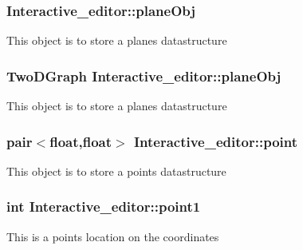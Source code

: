 \subsubsection[{\texorpdfstring{plane\+Obj}{planeObj}}]{ Interactive\+\_\+editor\+::plane\+Obj}\hypertarget{classInteractive__editor_ace6d6a503a0b62b7a8b6f87177dca677}{}\label{classInteractive__editor_ace6d6a503a0b62b7a8b6f87177dca677}
This object is to store a plane\textquotesingle{}s datastructure 
\subsubsection[{\texorpdfstring{plane\+Obj}{planeObj}}]{\setlength{\rightskip}{0pt plus 5cm}Two\+D\+Graph Interactive\+\_\+editor\+::plane\+Obj}\hypertarget{classInteractive__editor_aed0bc7a1d2cafae39f3fbf2eb119649c}{}\label{classInteractive__editor_aed0bc7a1d2cafae39f3fbf2eb119649c}
This object is to store a plane\textquotesingle{}s datastructure 
\subsubsection[{\texorpdfstring{point}{point}}]{\setlength{\rightskip}{0pt plus 5cm}pair$<$float,float$>$ Interactive\+\_\+editor\+::point}\hypertarget{classInteractive__editor_a5b1e9a4bfa2a98c594828367eeaf2acf}{}\label{classInteractive__editor_a5b1e9a4bfa2a98c594828367eeaf2acf}
This object is to store a point\textquotesingle{}s datastructure 
\subsubsection[{\texorpdfstring{point1}{point1}}]{\setlength{\rightskip}{0pt plus 5cm}int Interactive\+\_\+editor\+::point1}\hypertarget{classInteractive__editor_a07fe2897bcad8eabf5b98e01a162b2a1}{}\label{classInteractive__editor_a07fe2897bcad8eabf5b98e01a162b2a1}
This is a point\textquotesingle{}s location on the coordinates 
